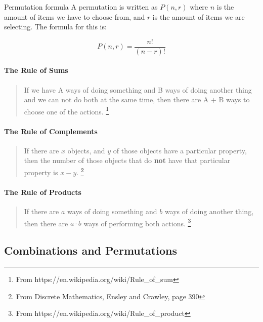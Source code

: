     \begin{intro}{Permutation formula}
        A permutation is written as $P(n, r)$ where $n$ is the amount of
        items we have to choose from, and $r$ is the amount of items we
        are selecting. The formula for this is:

        $$ P(n, r) = \frac{n!}{(n-r)!} $$

        \paragraph{The Rule of Sums}
        
        \begin{quote}
            If we have A ways of doing something and B ways of doing
            another thing and we can not do both at the same time, then there are A + B ways to choose one of the actions.
            \footnote{From https://en.wikipedia.org/wiki/Rule\_of\_sum}
        \end{quote}

        \paragraph{The Rule of Complements}
        
        \begin{quote}
            If there are $x$ objects, and $y$ of those objects have a particular property,
            then the number of those objects that do \textbf{not} have that particular
            property is $x - y$.
            \footnote{From Discrete Mathematics, Ensley and Crawley, page 390}
        \end{quote}

        \paragraph{The Rule of Products}
        
        \begin{quote}
            If there are $a$ ways of doing something and $b$
            ways of doing another thing, then there are $a \cdot b$ ways of performing both actions.
            \footnote{From https://en.wikipedia.org/wiki/Rule\_of\_product}
        \end{quote}
        
    \end{intro}
    
    \subsection{Combinations and Permutations}

